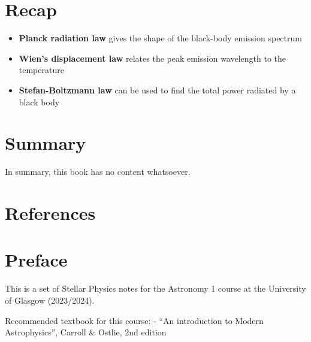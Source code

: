 \documentclass[
  letterpaper,
  DIV=11,
  numbers=noendperiod]{scrreprt}
\providecommand{\tightlist}{%
  \setlength{\itemsep}{0pt}\setlength{\parskip}{0pt}}\usepackage{longtable,booktabs,array}
\newlength{\cslhangindent}
\newlength{\cslentryspacingunit} %
\newenvironment{CSLReferences}[2] %
 {%
  \setlength{\parindent}{0pt}
  \ifodd #1
  \let\oldpar\par
  \def\par{\hangindent=\cslhangindent\oldpar}
  \fi
  \setlength{\parskip}{#2\cslentryspacingunit}
 }%
 {}
\begin{document}

\hypertarget{recap-1}{%
\chapter{Recap}\label{recap-1}}

\begin{itemize}
\tightlist
\item
  \textbf{Planck radiation law} gives the shape of the black-body
  emission spectrum
\item
  \textbf{Wien's displacement law} relates the peak emission wavelength
  to the temperature
\item
  \textbf{Stefan-Boltzmann law} can be used to find the total power
  radiated by a black body
\end{itemize}


\hypertarget{summary}{%
\chapter{Summary}\label{summary}}

In summary, this book has no content whatsoever.


\hypertarget{references}{%
\chapter*{References}\label{references}}


\hypertarget{refs}{}
\begin{CSLReferences}{0}{0}
\end{CSLReferences}


\hypertarget{preface-1}{%
\chapter*{Preface}\label{preface-1}}


This is a set of Stellar Physics notes for the Astronomy 1 course at the
University of Glasgow (2023/2024).

Recommended textbook for this course: - ``An introduction to Modern
Astrophysics'', Carroll \& Ostlie, 2nd edition
\end{document}
